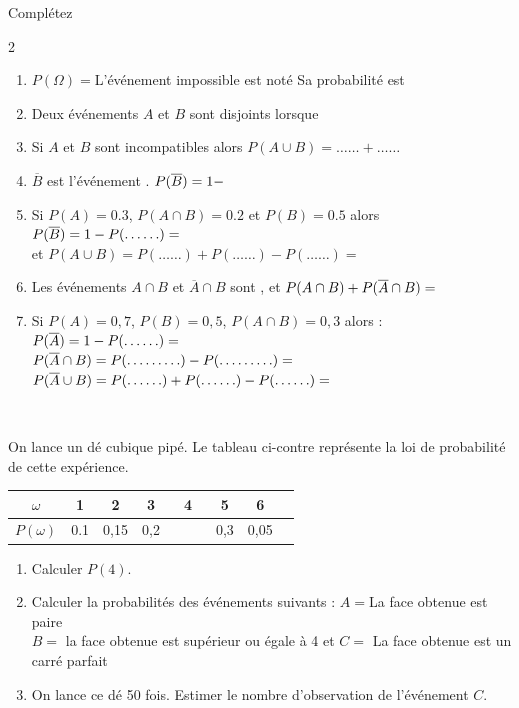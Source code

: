 \documentclass[main.tex]{subfiles}
\begin{document}
\begin{exercise}Complétez \vspace{-0.75em}
	\begin{spacing}{2}
		\begin{enumerate}[label=\arabic*), leftmargin=*]
			\item $P(\Omega)=$\dotfill L'événement impossible est noté \dotfill Sa probabilité est \dotfill
			\item Deux événements $A$ et $B$ sont disjoints lorsque \dotfill
			\item Si $A$ et $B$ sont incompatibles alors $P(A\cup B)=\ldots\ldots+\ldots\ldots$
			\item $\overline{B}$ est l'événement \dotfill. $P(\overline{B})=1-\dotfill$ 
			\item Si $P(A)=0.3$, $P(A\cap B)=0.2$  et $P(B)=0.5$  alors $P(\overline{B})=1-P(\ldots\ldots)=\dotfill$\\
			et  $P(A\cup B)=P(\ldots\ldots) + P(\ldots\ldots) - P(\ldots\ldots)=$\dotfill  
			\item Les événements $A\cap B$ et $\overline{A}\cap B$ sont \dotfill, et $P(A\cap B)+P(\overline{A}\cap B)=\dotfill $
			\item Si $P(A)=0,7$, $P(B)=0,5$, $P(A\cap B)=0,3$ alors :\\ $P(\overline{A})=1-P(\ldots\ldots)=\dotfill$\\
			$P(\overline{A}\cap B)=P(\ldots\ldots\ldots)-P(\ldots\ldots\ldots) =\dotfill $\\
			$P(\overline{A}\cup B)=P(\ldots\ldots)+P(\ldots\ldots)-P(\ldots\ldots)=\dotfill $
		\end{enumerate}
	\end{spacing}  \vspace{-0.75em}
\end{exercise}
\begin{exercise}\hfill \\ 
\noindent\parbox{0.52\linewidth}{ 
	On lance un dé cubique pipé. Le tableau ci-contre  représente la loi de probabilité de cette expérience.
}	
	\parbox{0.46\linewidth}{ \centering
		\renewcommand{\arraystretch}{1.5} 
		\begin{tabular}{|c|c|c|c|c|c|c|c|}
			\hline
			$\omega$&1&2&3&4&5&6\\\hline
			$P(\omega)$&0.1&0,15&0,2&$\qquad$&0,3&0,05\\\hline
		\end{tabular} 
}  
\begin{enumerate}[label=\arabic*), leftmargin=*]
	\item Calculer $P(4)$.
	\item Calculer la probabilités des événements suivants : $A=$\og La face obtenue est paire \fg{}\\
 $B=$ \og la face obtenue est supérieur ou égale à 4 \fg{} et 
		$C=$ \og La face obtenue est un carré parfait \fg 
	\item On lance ce dé 50 fois. Estimer le nombre d'observation de l'événement $C$.  
\end{enumerate} 
\end{exercise}
\end{document}
